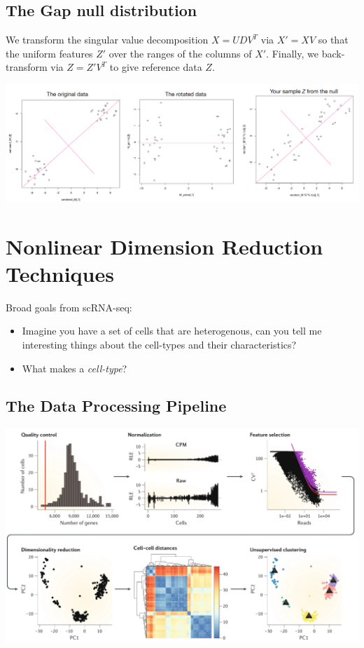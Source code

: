 \documentclass[10pt]{article}
\begin{document}
\subsection*{The Gap null distribution}
We transform the singular value decomposition $X = UDV^T$ via $X' = XV$ so that the uniform features $Z'$ over the ranges of the columns of $X'$.  Finally, we back-transform via $Z = Z'V^T$ to give reference data $Z$.

\begin{center}
    \includegraphics*[scale=0.44]{W8_6.png}
\end{center}

\section*{Nonlinear Dimension Reduction Techniques}
Broad goals from scRNA-seq:
\begin{itemize}
    \item Imagine you have a set of cells that are heterogenous, can you tell me interesting things about the cell-types and their characteristics?
    \item What makes a \textit{cell-type}?
\end{itemize}

\subsection*{The Data Processing Pipeline}
\begin{center}
    \includegraphics*[scale=0.5]{W8_7.png}
\end{center}
\end{document}
